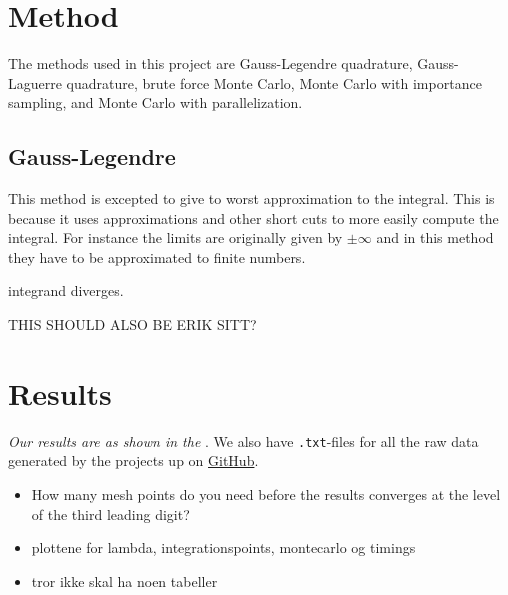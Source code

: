 \documentclass{article}
\begin{document}
\vspace{1cm}

\section{Method} \label{sec:Method}

The methods used in this project are Gauss-Legendre quadrature, Gauss-Laguerre quadrature, brute force Monte Carlo, Monte Carlo with importance sampling, and Monte Carlo with parallelization.

\subsection{Gauss-Legendre}

This method is excepted to give to worst approximation to the integral. This is because it uses approximations and other short cuts to more easily compute the integral. For instance the limits are originally given by $\pm \infty$ and in this method they have to be approximated to finite numbers.

integrand diverges.

THIS SHOULD ALSO BE ERIK SITT?

\vspace{1cm}

\section{Results} \label{sec:Results}

  \textit{Our results are as shown in the }. We also have \texttt{.txt}-files for all the raw data generated by the projects up on \href{https://github.com/Erikbgram/Fys3150}{GitHub}. \\

\begin{itemize}

  \item How many mesh points do you need before the results converges at the level of the third leading digit?

  \item plottene for lambda, integrationspoints, montecarlo og timings

  \item tror ikke skal ha noen tabeller

\end{itemize}
\end{document}
